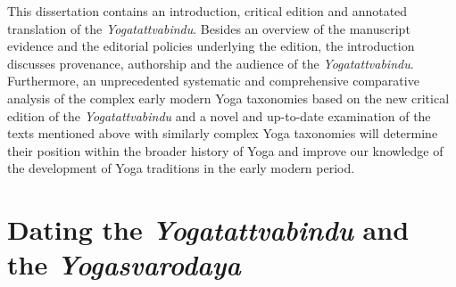 This dissertation contains an introduction, critical edition and annotated translation of the \textit{Yogatattvabindu}. Besides an overview of the manuscript evidence and the editorial policies underlying the edition, the introduction discusses provenance, authorship and the audience of the \textit{Yogatattvabindu}. Furthermore, an unprecedented systematic and comprehensive comparative analysis of the complex early modern Yoga taxonomies based on the new critical edition of the \textit{Yogatattvabindu} and a novel and up-to-date examination of the texts mentioned above with similarly complex Yoga taxonomies will determine their position within the broader history of Yoga and improve our knowledge of the development of Yoga traditions in the early modern period.

\section{Dating the \textit{Yogatattvabindu} and the \emph{Yogasvarodaya}}
\label{dating}
